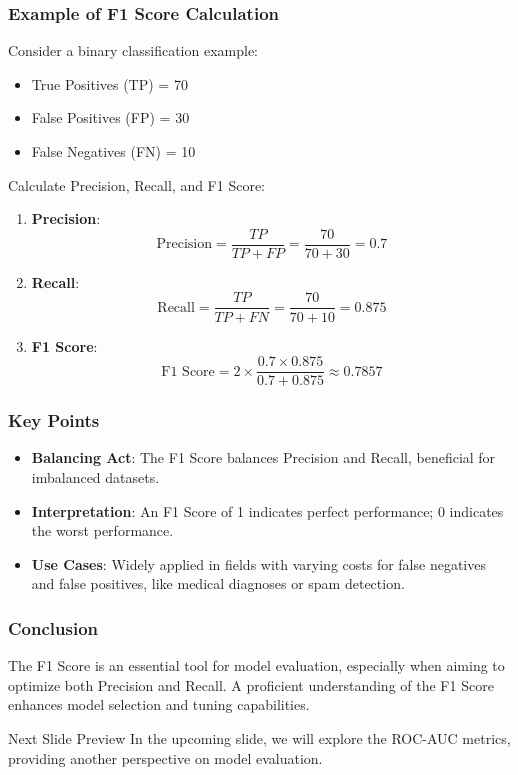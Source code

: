 \documentclass[aspectratio=169]{beamer}
\begin{document}
\begin{frame}[fragile]
    \frametitle{Example of F1 Score Calculation}
    Consider a binary classification example:
    \begin{itemize}
        \item True Positives (TP) = 70
        \item False Positives (FP) = 30
        \item False Negatives (FN) = 10
    \end{itemize}
    
    Calculate Precision, Recall, and F1 Score:
    
    \begin{enumerate}
        \item \textbf{Precision}:
        \begin{equation}
            \text{Precision} = \frac{TP}{TP + FP} = \frac{70}{70 + 30} = 0.7
        \end{equation}
        \item \textbf{Recall}:
        \begin{equation}
            \text{Recall} = \frac{TP}{TP + FN} = \frac{70}{70 + 10} = 0.875
        \end{equation}
        \item \textbf{F1 Score}:
        \begin{equation}
            \text{F1 Score} = 2 \times \frac{0.7 \times 0.875}{0.7 + 0.875} \approx 0.7857
        \end{equation}
    \end{enumerate}
\end{frame}

\begin{frame}[fragile]
    \frametitle{Key Points}
    \begin{itemize}
        \item \textbf{Balancing Act}: The F1 Score balances Precision and Recall, beneficial for imbalanced datasets.
        \item \textbf{Interpretation}: An F1 Score of 1 indicates perfect performance; 0 indicates the worst performance.
        \item \textbf{Use Cases}: Widely applied in fields with varying costs for false negatives and false positives, like medical diagnoses or spam detection.
    \end{itemize}
\end{frame}

\begin{frame}[fragile]
    \frametitle{Conclusion}
    The F1 Score is an essential tool for model evaluation, especially when aiming to optimize both Precision and Recall. A proficient understanding of the F1 Score enhances model selection and tuning capabilities.

    \begin{block}{Next Slide Preview}
        In the upcoming slide, we will explore the ROC-AUC metrics, providing another perspective on model evaluation.
    \end{block}
\end{frame}
\end{document}
